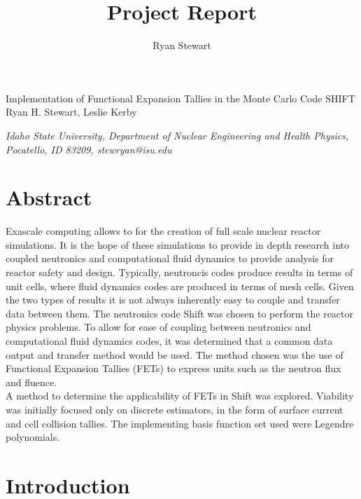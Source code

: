 \documentclass[10tma4paper]{article}
\title{Project Report}
\author{Ryan Stewart}
\begin{document}
	\begin{center}
		Implementation of Functional Expansion Tallies in the 
		Monte Carlo Code SHIFT
		\\
		\bigskip
		\small{Ryan H. Stewart, Leslie} Kerby
		\\
	\end{center}
	
	\begin{center}
		\textit{\small{Idaho State University, Department of Nuclear Engineering and Health Physics, Pocatello, ID 83209, stewryan@isu.edu}}
	\end{center}
	

\section{Abstract}\label{abstract}

Exascale computing allows to for the creation of full scale nuclear reactor simulations. It is the hope of these simulations to provide in depth research into coupled neutronics and computational fluid dynamics to provide analysis for reactor safety and design. Typically, neutroncis codes produce results in terms of unit cells, where fluid dynamics codes are produced in terms of mesh cells. Given the two types of results it is not always inherently easy to couple and transfer data between them. The neutronics code Shift was chosen to perform the reactor physics problems. To allow for ease of coupling between neutronics and computational fluid dynamics codes, it was determined that a common data output and transfer method would be used. The method chosen was the use of Functional Expansion Tallies (FETs) to express units such as the neutron flux and fluence.
\\A method to determine the applicability of FETs in Shift was explored. Viability was initially focused only on discrete estimators, in the form of surface current and cell collision tallies. The implementing basis function set used were Legendre polynomials.

\section{Introduction}\label{intro}
\end{document}
